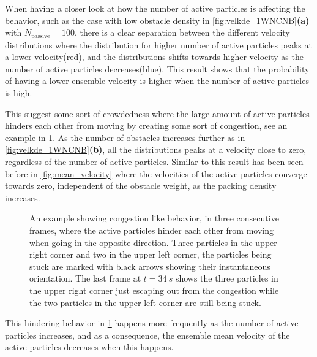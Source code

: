 When having a closer look at how the number of 
active particles is affecting the behavior, 
such as the case with low obstacle density in 
\cref{fig:velkde_1WNCNB}\textbf{(a)} with 
$N_{\text{passive}}=100$, there is a clear separation 
between the different velocity distributions where the 
distribution for higher number of active particles peaks 
at a lower velocity(red), and the distributions shifts 
towards higher velocity as the number of active particles decreases(blue).
This result shows that the probability of having a lower 
ensemble velocity is higher when the number of active particles is high.

This suggest some sort of crowdedness where the large 
amount of active particles hinders each other from moving 
by creating some sort of congestion, see an example in 
\cref{fig:0W300C25B_congestion}. As the number of obstacles 
increases further as in \cref{fig:velkde_1WNCNB}\textbf{(b)}, 
all the distributions peaks at a velocity close to zero, 
regardless of the number of active particles. Similar to this result 
has been seen before in \cref{fig:mean_velocity} 
where the velocities of the active particles converge towards zero, 
independent of the obstacle weight, as the packing density increases.    


\begin{figure}[htbp]
\centering
{} \quad
{} \quad
{} \quad
\caption{An example showing congestion like behavior, 
in three consecutive frames,  where the active particles hinder each 
other from moving when going in the opposite direction. 
Three particles in the upper right corner and 
two in the upper left corner, the particles being stuck 
are marked with black arrows showing their instantaneous orientation. 
The last frame at $t=\SI{34}{s}$ shows the three particles 
in the upper right corner just escaping out from the congestion 
while the two particles in the upper left corner are still being stuck.}
\label{fig:0W300C25B_congestion}
\end{figure}

This hindering behavior in \cref{fig:0W300C25B_congestion} 
happens more frequently as the number of active particles increases, 
and as a consequence, the ensemble mean velocity of the active 
particles decreases when this happens. 

